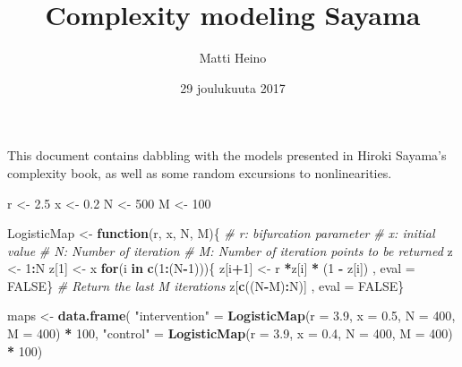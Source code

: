 \documentclass[]{article}
\title{Complexity modeling Sayama}
\author{Matti Heino}
\date{29 joulukuuta 2017}
\newenvironment{Shaded}{\begin{snugshade}}{\end{snugshade}}
\newcommand{\KeywordTok}[1]{\textcolor[rgb]{0.13,0.29,0.53}{\textbf{#1}}}
\newcommand{\DataTypeTok}[1]{\textcolor[rgb]{0.13,0.29,0.53}{#1}}
\newcommand{\DecValTok}[1]{\textcolor[rgb]{0.00,0.00,0.81}{#1}}
\newcommand{\FloatTok}[1]{\textcolor[rgb]{0.00,0.00,0.81}{#1}}
\newcommand{\StringTok}[1]{\textcolor[rgb]{0.31,0.60,0.02}{#1}}
\newcommand{\CommentTok}[1]{\textcolor[rgb]{0.56,0.35,0.01}{\textit{#1}}}
\newcommand{\OtherTok}[1]{\textcolor[rgb]{0.56,0.35,0.01}{#1}}
\newcommand{\ControlFlowTok}[1]{\textcolor[rgb]{0.13,0.29,0.53}{\textbf{#1}}}
\newcommand{\OperatorTok}[1]{\textcolor[rgb]{0.81,0.36,0.00}{\textbf{#1}}}
\newcommand{\NormalTok}[1]{#1}
\begin{document}
\maketitle

This document contains dabbling with the models presented in Hiroki
Sayama's complexity book, as well as some random excursions to
nonlinearities.

\begin{Shaded}
\begin{Highlighting}[]
\NormalTok{r <-}\StringTok{ }\FloatTok{2.5}
\NormalTok{x <-}\StringTok{ }\FloatTok{0.2}
\NormalTok{N <-}\StringTok{ }\DecValTok{500}
\NormalTok{M <-}\StringTok{ }\DecValTok{100}

\NormalTok{LogisticMap <-}\StringTok{ }\ControlFlowTok{function}\NormalTok{(r, x, N, M)\{}
  \CommentTok{# r: bifurcation parameter}
  \CommentTok{# x: initial value}
  \CommentTok{# N: Number of iteration}
  \CommentTok{# M: Number of iteration points to be returned}
\NormalTok{  z <-}\StringTok{ }\DecValTok{1}\OperatorTok{:}\NormalTok{N}
\NormalTok{  z[}\DecValTok{1}\NormalTok{] <-}\StringTok{ }\NormalTok{x}
  \ControlFlowTok{for}\NormalTok{(i }\ControlFlowTok{in} \KeywordTok{c}\NormalTok{(}\DecValTok{1}\OperatorTok{:}\NormalTok{(N}\OperatorTok{-}\DecValTok{1}\NormalTok{)))\{}
\NormalTok{    z[i}\OperatorTok{+}\DecValTok{1}\NormalTok{] <-}\StringTok{ }\NormalTok{r }\OperatorTok{*}\NormalTok{z[i]  }\OperatorTok{*}\StringTok{ }\NormalTok{(}\DecValTok{1} \OperatorTok{-}\StringTok{ }\NormalTok{z[i])}
\NormalTok{  , eval =}\StringTok{ }\OtherTok{FALSE}\NormalTok{\}}
  \CommentTok{# Return the last M iterations }
\NormalTok{  z[}\KeywordTok{c}\NormalTok{((N}\OperatorTok{-}\NormalTok{M)}\OperatorTok{:}\NormalTok{N)]}
\NormalTok{, eval =}\StringTok{ }\OtherTok{FALSE}\NormalTok{\}}

\NormalTok{maps <-}\StringTok{ }\KeywordTok{data.frame}\NormalTok{(}
    \StringTok{"intervention"}\NormalTok{ =}\StringTok{ }\KeywordTok{LogisticMap}\NormalTok{(}\DataTypeTok{r =} \FloatTok{3.9}\NormalTok{, }\DataTypeTok{x =} \FloatTok{0.5}\NormalTok{, }\DataTypeTok{N =} \DecValTok{400}\NormalTok{, }\DataTypeTok{M =} \DecValTok{400}\NormalTok{) }\OperatorTok{*}\StringTok{ }\DecValTok{100}\NormalTok{,}
    \StringTok{"control"}\NormalTok{ =}\StringTok{ }\KeywordTok{LogisticMap}\NormalTok{(}\DataTypeTok{r =} \FloatTok{3.9}\NormalTok{, }\DataTypeTok{x =} \FloatTok{0.4}\NormalTok{, }\DataTypeTok{N =} \DecValTok{400}\NormalTok{, }\DataTypeTok{M =} \DecValTok{400}\NormalTok{) }\OperatorTok{*}\StringTok{ }\DecValTok{100}\NormalTok{)}


\end{Highlighting}
\end{Shaded}
\end{document}
